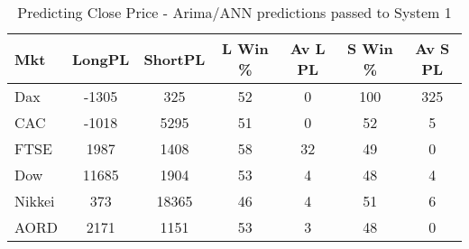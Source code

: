 \begin{table}[ht]
\centering
\caption[Predicting Close Price - Arima/ANN predictions passed to System 1.]{Predicting Close Price - Arima/ANN predictions passed to System 1} 
\label{tab:chp_ts:arima_ann_sys1}
\begin{tabular}{lcccccc}
  \toprule Mkt & LongPL & ShortPL & L Win \% & Av L PL & S Win \% & Av S PL \\ 
  \midrule Dax & -1305 & 325 & 52 & 0 & 100 & 325 \\ 
  CAC & -1018 & 5295 & 51 & 0 & 52 & 5 \\ 
  FTSE & 1987 & 1408 & 58 & 32 & 49 & 0 \\ 
  Dow & 11685 & 1904 & 53 & 4 & 48 & 4 \\ 
  Nikkei & 373 & 18365 & 46 & 4 & 51 & 6 \\ 
  AORD & 2171 & 1151 & 53 & 3 & 48 & 0 \\ 
   \bottomrule \end{tabular}
\end{table}
